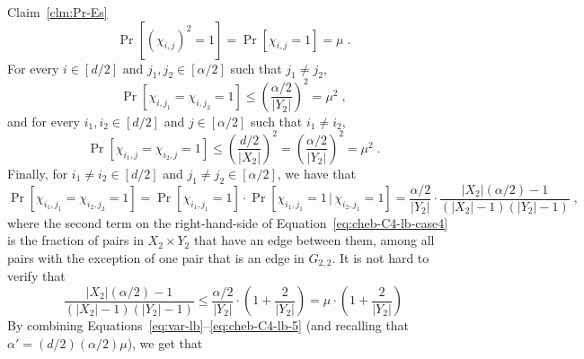 \begin{proofof}{Claim~\ref{clm:Pr-Es}}
\begin{equation} \label{eq:cheb-C4-lb-case1}
\Pr[(\chi_{i,j})^2 = 1] = \Pr[\chi_{i,j}=1] = \mu\;.
\end{equation}
 For every $i\in [d/2]$ and $j_1,j_2 \in [\alpha/2]$ such that $j_1 \neq j_2$,
\begin{equation}\label{eq:cheb-C4-lb-case2}
\Pr[\chi_{i,j_1}=\chi_{i,j_2}=1]
  \leq \left( \frac{\alpha/2}{|Y_2|}\right)^2 = \mu^2
  \;,
\end{equation}
and for every $i_1,i_2\in [d/2]$ and $j\in [\alpha/2]$ such that $i_1\neq i_2$,
\begin{equation}\label{eq:cheb-C4-lb-case3}
 \Pr[\chi_{i_1,j}=\chi_{i_2,j}=1]
\leq %
\left( \frac{d/2}{|X_2|}\right)^2 = \left( \frac{\alpha/2}{|Y_2|}\right)^2 = \mu^2 %
\;.
\end{equation}
Finally,
for $i_1\neq i_2\in [d/2]$ and $j_1\neq j_2\in [\alpha/2]$, we have that
\begin{equation}\label{eq:cheb-C4-lb-case4}
\Pr[\chi_{i_1,j_1}=\chi_{i_2,j_2}=1]
=  \Pr[\chi_{i_1,j_1}=1] \cdot
\Pr[\chi_{i_1,j_1}=1\,|\,\chi_{i_2,j_1}=1]
  =\frac{\alpha/2}{|Y_2|}\cdot \frac{|X_2|(\alpha/2)-1}{(|X_2|-1)(|Y_2|-1)}\;,
\end{equation}
where the second term on the right-hand-side of Equation~\eqref{eq:cheb-C4-lb-case4} is the fraction of pairs in $X_2\times Y_2$ that have an edge between them, among all pairs with the exception of one pair that is an edge in $G_{2,2}$.
It is not hard to verify that
\begin{equation}\label{eq:cheb-C4-lb-5}
 \frac{|X_2|(\alpha/2)-1}{(|X_2|-1)(|Y_2|-1)} \leq \frac{\alpha/2}{|Y_2|} \cdot \left(1+\frac{2}{|Y_2|}\right) = \mu \cdot \left(1+\frac{2}{|Y_2|}\right)
\end{equation}
By combining Equations~\eqref{eq:var-lb}--\eqref{eq:cheb-C4-lb-5} (and recalling that $\alpha' = (d/2)(\alpha/2)\mu$), we get that
\begin{eqnarray}

\end{eqnarray}
\end{proofof}
